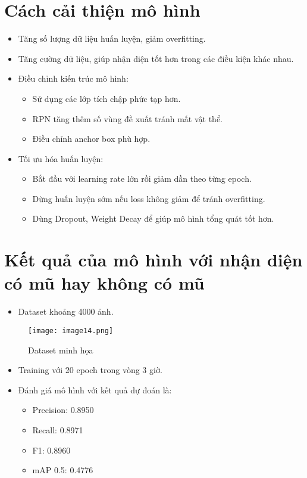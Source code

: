 \documentclass{article}
\begin{document}
\section{Cách cải thiện mô hình}
\begin{itemize}
    \item Tăng số lượng dữ liệu huấn luyện, giảm overfitting.
    \item Tăng cường dữ liệu, giúp nhận diện tốt hơn trong các điều kiện khác nhau.
    \item Điều chỉnh kiến trúc mô hình:
    \begin{itemize}
        \item Sử dụng các lớp tích chập phức tạp hơn.
        \item RPN tăng thêm số vùng đề xuất tránh mất vật thể.
        \item Điều chỉnh anchor box phù hợp.
    \end{itemize}
    \item Tối ưu hóa huấn luyện:
    \begin{itemize}
        \item Bắt đầu với learning rate lớn rồi giảm dần theo từng epoch.
        \item Dừng huấn luyện sớm nếu loss không giảm để tránh overfitting.
        \item Dùng Dropout, Weight Decay để giúp mô hình tổng quát tốt hơn.
    \end{itemize}
\end{itemize}

\section{Kết quả của mô hình với nhận diện có mũ hay không có mũ}
\begin{itemize}
    \item Dataset khoảng 4000 ảnh.
\end{itemize}

\begin{figure}[H]
    \centering
    \texttt{[image: image14.png]}
    \caption{Dataset minh họa}
\end{figure}

\begin{itemize}
    \item Training với 20 epoch trong vòng 3 giờ.
    \item Đánh giá mô hình với kết quả dự đoán là:
    \begin{itemize}
        \item Precision: 0.8950
        \item Recall: 0.8971
        \item F1: 0.8960
        \item mAP 0.5: 0.4776
    \end{itemize}
\end{itemize}
\end{document}

